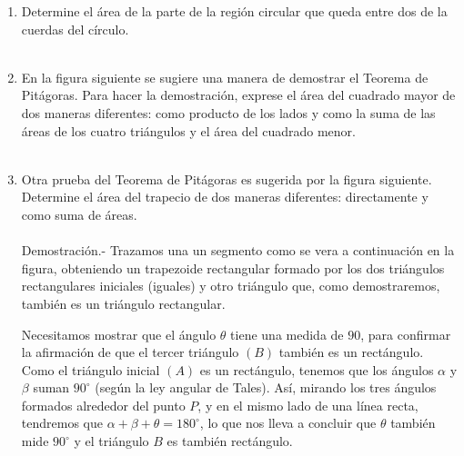 \documentclass[10pt]{article}
\begin{document}
\begin{enumerate}
\item Determine el área de la parte de la región circular que queda entre dos de la cuerdas del círculo.\\\\

\item  En la figura siguiente se sugiere una manera de demostrar el Teorema de Pitágoras. Para hacer la demostración, exprese el área del cuadrado mayor de dos maneras diferentes: como producto de los lados y como la suma de las áreas de los cuatro triángulos y el área del cuadrado menor.\\\\

\item Otra prueba del Teorema de Pitágoras es sugerida por la figura siguiente. Determine el área del trapecio de dos maneras diferentes: directamente y como suma de áreas.\\\\
    Demostración.-\; Trazamos una un segmento como se vera a continuación en  la figura, obteniendo un trapezoide rectangular formado por los dos triángulos rectangulares iniciales (iguales) y otro triángulo que, como demostraremos, también es un triángulo rectangular.
    \begin{center}
    \end{center}
    Necesitamos mostrar que el ángulo $\theta$ tiene una medida de $90$, para confirmar la afirmación de que el tercer triángulo $(B)$ también es un rectángulo.\\
    Como el triángulo inicial $(A)$ es un rectángulo, tenemos que los ángulos $\alpha$ y $\beta$ suman $90^\circ$ (según la ley angular de Tales). Así, mirando los tres ángulos formados alrededor del punto $P$, y en el mismo lado de una línea recta, tendremos que $\alpha + \beta + \theta = 180^\circ$, lo que nos lleva a concluir que $\theta$ también mide $90^\circ$  y el triángulo $B$ es también rectángulo.\\

\end{enumerate}
\end{document}
